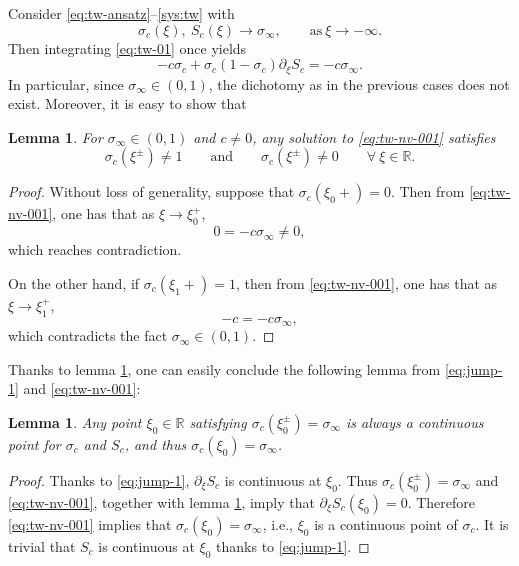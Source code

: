 \documentclass[12pt]{article}
\newtheorem{lemma}[theorem]{Lemma}
\theoremstyle{definition}
\theoremstyle{remark}
\numberwithin{equation}{section}
\begin{document}
Consider \eqref{eq:tw-ansatz}--\eqref{sys:tw} with 
\begin{equation}
    \label{eq:tw-nv-ff}
    \sigma_c(\xi), \ S_c(\xi) \rightarrow \sigma_\infty, \qquad \text{as} \ \xi \rightarrow - \infty. 
\end{equation}
Then integrating \eqref{eq:tw-01} once yields
\begin{equation}
    \label{eq:tw-nv-001}
    - c \sigma_c + \sigma_c (1-\sigma_c) \partial_\xi S_c = - c \sigma_\infty.
\end{equation}
In particular, since $ \sigma_\infty \in (0,1) $, the dichotomy as in the previous cases does not exist. Moreover, it is easy to show that
\begin{lemma}
\label{lm:no-trivial-point}
    For $ \sigma_\infty \in (0,1) $ and $ c \neq 0 $, any solution to \eqref{eq:tw-nv-001} satisfies
    \begin{equation}
        \label{eq:tw-nv-002}
        \sigma_c(\xi^\pm) \neq 1 \qquad \text{and} \qquad \sigma_c(\xi^\pm) \neq 0 \qquad \forall \ \xi \in \mathbb R. 
    \end{equation}
\end{lemma}
\begin{proof}
    Without loss of generality, suppose that $ \sigma_c (\xi_0+) = 0 $. Then from \eqref{eq:tw-nv-001}, one has that as $ \xi \rightarrow \xi_0^+ $, 
    \begin{equation}
        0 = - c \sigma_\infty \neq 0,
    \end{equation}
    which reaches contradiction. 

    On the other hand, if $ \sigma_c(\xi_1+) = 1 $, then from \eqref{eq:tw-nv-001}, one has that as $ \xi \rightarrow \xi_1^+ $,
    \begin{equation}
        - c = - c \sigma_\infty,
    \end{equation}
    which contradicts the fact $ \sigma_\infty \in (0,1)$. 
\end{proof}

Thanks to lemma \ref{lm:no-trivial-point}, one can easily conclude the following lemma from \eqref{eq:jump-1} and \eqref{eq:tw-nv-001}:

\begin{lemma}
\label{lm:cnt-ttrivial-point}
    Any point $ \xi_0 \in \mathbb R $ satisfying $ \sigma_c(\xi_0^\pm) = \sigma_\infty $ is always a continuous point for $ \sigma_c $ and $ S_c $, and thus $ \sigma_c(\xi_0) = \sigma_\infty $. 
\end{lemma}
\begin{proof}
    Thanks to \eqref{eq:jump-1}, $ \partial_\xi S_c $ is continuous at $ \xi_0 $. Thus $ \sigma_c(\xi_0^\pm) = \sigma_\infty $ and \eqref{eq:tw-nv-001}, together with lemma \ref{lm:no-trivial-point}, imply that $ \partial_\xi S_c(\xi_0) = 0 $. Therefore \eqref{eq:tw-nv-001} implies that $ \sigma_c (\xi_0) = \sigma_\infty $, i.e., $\xi_0 $ is a continuous point of $ \sigma_c $. It is trivial that $ S_c $ is continuous at $ \xi_0 $ thanks to \eqref{eq:jump-1}. 
\end{proof}
\end{document}
